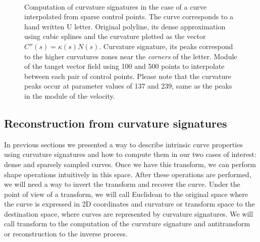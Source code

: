 \documentclass{ipol}
\newcommand{\chapFiveDir}{images/chapter_05a}
\begin{document}
\begin{figure}[h]
	\centering
	\\
	\caption{Computation of curvature signatures in the case of a curve interpolated from sparse control points. The curve corresponds to a hand written U letter. \protect{} Original polyline, its dense approximation using cubic splines and the curvature plotted as the vector $C''(s)=\kappa(s)N(s)$. \protect{} Curvature signature, its peaks correspond to the higher curvatures zones near the \emph{corners} of the letter.
		\protect{} Module of the tanget vector field using 100 and 500 points to interpolate between each pair of control points.
		Please note that the curvature peaks occur at parameter values of 137 and 239, same as the peaks in the module of the velocity.
}
	\label{fig:image_interpolation:curve_interpolation:polyline:normals}
\end{figure}

\subsection{Reconstruction from curvature signatures}
In previous sections we presented a way to describe intrinsic curve properties using curvature signatures and how to compute them in our two cases of interest: dense and sparsely sampled curves.
Once we have this transform, we can perform shape operations intuitively in this space. After these operations are performed, we will need a way to invert the transform and recover the curve.
Under the point of view of a transform, we will call Euclidean to the original space where the curve is expressed in 2D coordinates and curvature or transform space to the destination space, where curves are represented by curvature signatures.
We will call transform to the computation of the curvature signature and antitransform or reconstruction to the inverse process.
\end{document}
